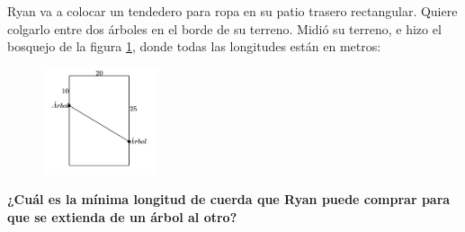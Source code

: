 \question[15]  Ryan va a colocar un tendedero para ropa en su patio trasero rectangular.
Quiere colgarlo entre dos árboles en el borde de su terreno.
Midió su terreno, e hizo el bosquejo de la figura \ref{fig:des_pitagoras_05}, donde todas las longitudes están en metros:
\begin{figure}[H]
    \begin{center}
        \includegraphics[width=0.3\textwidth]{../images/des_pitagoras_05.png}
    \end{center}
    \caption{}
    \label{fig:des_pitagoras_05}
\end{figure}

\textbf{¿Cuál es la mínima longitud de cuerda que Ryan puede comprar para que se extienda de un árbol al otro?}

